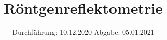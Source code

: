 
\usepackage{listings}

\subject{Nr. 44}
\title{Röntgenreflektometrie}
\date{%
  Durchführung: 10.12.2020
  \hspace{3em}
  Abgabe: 05.01.2021
}



\maketitle
\thispagestyle{empty}
\tableofcontents
\newpage






\printbibliography{}


